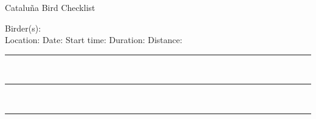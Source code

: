 \documentclass{article}
\newcommand{\newnoteline}{\rule{\textwidth}{0.15mm}\\[1.5ex]}
\begin{document}
\centering
\LARGE{Cataluña Bird Checklist}\\
\normalsize \raggedright


Birder(s): \underline{\hspace{112ex}}\\[1.5ex]
Location: \underline{\hspace{28ex}}    Date: \underline{\hspace{13ex}}    Start time: \underline{\hspace{10ex}}   Duration: \underline{\hspace{10ex}}    Distance: \underline{\hspace{10ex}}\\[1.5ex]


\newnoteline\newnoteline\newnoteline


\begin{center}


\end{center}
\end{document}
